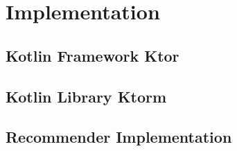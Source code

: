 \chapter{Implementation}

\section{Kotlin Framework Ktor}

\section{Kotlin Library Ktorm}

\section{Recommender Implementation}